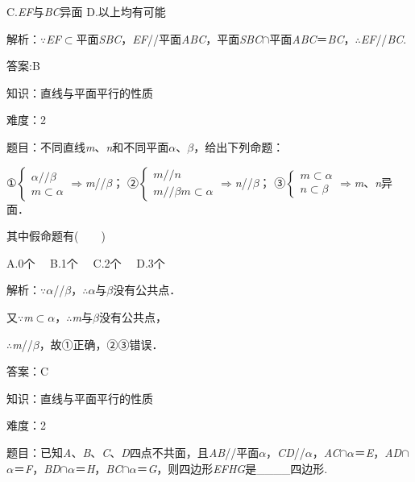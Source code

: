 \documentclass{article} %
\begin{document}
C.\textit{EF}与\textit{BC}异面  D.以上均有可能

解析：$\mathrm{\because}$\textit{EF}$\mathrm{\subset }$平面\textit{SBC}，\textit{EF}//平面\textit{ABC}，平面\textit{SBC}$\mathrm{\cap}$平面\textit{ABC}＝\textit{BC}，$\mathrm{\therefore}$\textit{EF}//\textit{BC}.

答案:B

知识：直线与平面平行的性质

难度：2

题目：不同直线\textit{m}、\textit{n}和不同平面\textit{$\alpha$}、\textit{$\beta$}，给出下列命题：

①$\left\{\begin{array}{l}\alpha // \beta\\ m\subset \alpha \end{array}\right.\mathrm{\Rightarrow }$\textit{m}//\textit{$\beta$}；
②$\left\{\begin{array}{l} m//n\\ m//\beta m\subset \alpha \end{array}\right.\mathrm{\Rightarrow }$\textit{n}//\textit{$\beta$}；
③$\left\{\begin{array}{l} m\subset \alpha\\ n\subset \beta \end{array}\right.\mathrm{\Rightarrow }$\textit{m}、\textit{n}异面．

其中假命题有(　　)

A.0个　 B.1个　 C.2个　 D.3个

解析：$\mathrm{\because}$\textit{$\alpha$}//\textit{$\beta$}，$\mathrm{\therefore}$\textit{$\alpha$}与\textit{$\beta$}没有公共点．

又$\mathrm{\because}$\textit{m}$\mathrm{\subset }$\textit{$\alpha$}，$\mathrm{\therefore}$\textit{m}与\textit{$\beta$}没有公共点，

$\mathrm{\therefore}$\textit{m}//\textit{$\beta$}，故①正确，②③错误．

答案：C

知识：直线与平面平行的性质

难度：2

题目：已知\textit{A}、\textit{B}、\textit{C}、\textit{D}四点不共面，且\textit{AB}//平面\textit{$\alpha$}，\textit{CD}//\textit{$\alpha$}，\textit{AC}$\mathrm{\cap}$\textit{$\alpha$}＝\textit{E}，\textit{AD}$\mathrm{\cap}$\textit{$\alpha$}＝\textit{F}，\textit{BD}$\mathrm{\cap}$\textit{$\alpha$}＝\textit{H}，\textit{BC}$\mathrm{\cap}$\textit{$\alpha$}＝\textit{G}，则四边形\textit{EFHG}是\_\_\_\_四边形.
\end{document}
